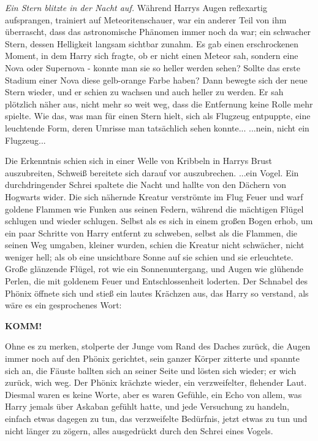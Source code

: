 \emph{Ein Stern blitzte in der Nacht auf.}
Während Harrys Augen reflexartig aufsprangen, trainiert auf Meteoritenschauer,
war ein anderer Teil von ihm überrascht, dass das astronomische Phänomen immer
noch da war; ein schwacher Stern, dessen Helligkeit langsam sichtbar zunahm. Es
gab einen erschrockenen Moment, in dem Harry sich fragte, ob er nicht einen
Meteor sah, sondern eine Nova oder Supernova - konnte man sie so heller werden
sehen? Sollte das erste Stadium einer Nova diese gelb-orange Farbe haben? Dann
bewegte sich der neue Stern wieder, und er schien zu wachsen und auch heller zu
werden. Er sah plötzlich näher aus, nicht mehr so weit weg, dass die Entfernung
keine Rolle mehr spielte. Wie das, was man für einen Stern hielt, sich als
Flugzeug entpuppte, eine leuchtende Form, deren Umrisse man tatsächlich sehen
konnte... ...nein, nicht ein Flugzeug...

Die Erkenntnis schien sich in einer Welle von Kribbeln in Harrys Brust
auszubreiten, Schweiß bereitete sich darauf vor auszubrechen. ...ein Vogel. Ein
durchdringender Schrei spaltete die Nacht und hallte von den Dächern von
Hogwarts wider. Die sich nähernde Kreatur verströmte im Flug Feuer und warf
goldene Flammen wie Funken aus seinen Federn, während die mächtigen Flügel
schlugen und wieder schlugen. Selbst als es sich in einem großen Bogen erhob, um
ein paar Schritte von Harry entfernt zu schweben, selbst als die Flammen, die
seinen Weg umgaben, kleiner wurden, schien die Kreatur nicht schwächer, nicht
weniger hell; als ob eine unsichtbare Sonne auf sie schien und sie erleuchtete.
Große glänzende Flügel, rot wie ein Sonnenuntergang, und Augen wie glühende
Perlen, die mit goldenem Feuer und Entschlossenheit loderten. Der Schnabel des
Phönix öffnete sich und stieß ein lautes Krächzen aus, das Harry so verstand,
als wäre es ein gesprochenes Wort:

\textbf{KOMM!}

Ohne es zu merken, stolperte der Junge vom Rand des Daches zurück, die Augen
immer noch auf den Phönix gerichtet, sein ganzer Körper zitterte und spannte
sich an, die Fäuste ballten sich an seiner Seite und lösten sich wieder; er wich
zurück, wich weg. Der Phönix krächzte wieder, ein verzweifelter, flehender Laut.
Diesmal waren es keine Worte, aber es waren Gefühle, ein Echo von allem, was
Harry jemals über Askaban gefühlt hatte, und jede Versuchung zu handeln, einfach
etwas dagegen zu tun, das verzweifelte Bedürfnis, jetzt etwas zu tun und nicht
länger zu zögern, alles ausgedrückt durch den Schrei eines Vogels.


